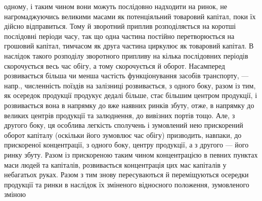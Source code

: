 одному, і таким чином вони можуть послідовно надходити на ринок, не
нагромаджуючись великими масами як потенціяльний товаровий капітал,
поки їх дійсно відправиться. Тому й зворотний приплив розподіляється
на коротші послідовні періоди часу, так що одна частина постійно перетворюється
на грошовий капітал, тимчасом як друга частина циркулює
як товаровий капітал. В наслідок такого розподілу зворотного
припливу на кілька послідовних періодів скорочується весь час обігу, а
тому скорочується й оборот. Насамперед розвивається більша чи менша
частість функціонування засобів транспорту, — напр., численність поїздів
на залізниці розвивається, з одного боку, разом із тим, як осередок
продукції продукує дедалі більше, стає більшим центром продукції, і
розвивається вона в напрямку до вже наявних ринків збуту, отже, в напрямку
до великих центрів продукції та залюднення, до вивізних портів
тощо. Але, з другого боку, ця особлива легкість сполучень і зумовлений
нею прискорений оборот капіталу (оскільки його зумовлює час обігу)
призводить, навпаки, до прискореної концентрації, з одного боку, центру
продукції, а з другого — його ринку збуту. Разом із прискореною
таким чином концентрацією в певних пунктах маси людей та капіталів,
розвивається концентрація цих мас капіталів у небагатьох руках. Разом
з тим знову пересуваються й переміщуються осередки продукції та ринки
в наслідок їх зміненого відносного положення, зумовленого зміною
\parbreak{}  %
